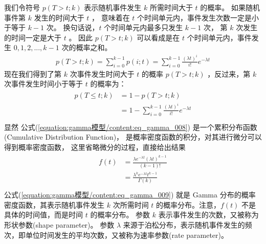 \documentclass[letterpaper,10pt,english]{sphinxmanual}
\begin{document}
我们令符号 \(p(T>t;k)\) 表示随机事件发生 \(k\) 所需时间大于 \(t\) 的概率。
如果随机事件第 \(k\) 发生的时间大于 \(t\) ，
意味着在 \(t\) 个时间单元内，事件发生次数一定是小于等于 \(k-1\) 次。
换句话说，\(t\) 个时间单元内最多只发生 \(k-1\) 次，
第 \(k\) 次发生的时间一定是大于 \(t\) 。
因此 \(p(T>t;k)\) 可以看成是在 \(t\) 个时间单元内，事件发生 \(0,1,2,...,k-1\) 次的概率之和。
\begin{equation}\label{equation:gamma模型/content:gamma模型/content:3}
\begin{split}p(T>t;k) = \sum_{i=0}^{k-1} p(i;t)
= \sum_{i=0}^{k-1} \frac{(\lambda t)^{i}}{i!}  e^{-\lambda t}\end{split}
\end{equation}
现在我们得到了第 \(k\) 次事件发生时间大于 \(t\) 的概率 \(p(T>t;k)\)
，反过来，第 \(k\) 次事件发生时间小于等于 \(t\) 的概率为：
\begin{align}\label{equation:gamma模型/content:eq_gamma_008}\!\begin{aligned}
p(T\le t;k) &= 1-p(T>t;k)\\
&= 1- \sum_{i=0}^{k-1} \frac{(\lambda t)^{i}}{i!}  e^{-\lambda t}\\
\end{aligned}\end{align}
显然 公式(\ref{equation:gamma模型/content:eq_gamma_008}) 是一个累积分布函数(Cumulative Distribution Function)，
是概率密度函数的积分，对其进行微分可以得到概率密度函数，
这里省略微分的过程，直接给出结果
\begin{align}\label{equation:gamma模型/content:eq_gamma_009}\!\begin{aligned}
f(t)
&= \frac{\lambda e^{-\lambda t}(\lambda t)^{k-1}}{(k-1)!}\\
&= \frac{\lambda^k e^{-\lambda t}t^{k-1}}{\Gamma(k)}\\
\end{aligned}\end{align}
公式(\ref{equation:gamma模型/content:eq_gamma_009}) 就是 Gamma 分布的概率密度函数，其表示随机事件发生 \(k\) 次所需时间 \(t\)
的概率分布。注意，\(f(t)\) 不是具体的时间值，而是时间 \(t\) 的概率分布。
参数 \(k\) 表示事件发生的次数，又被称为形状参数(shape parameter)。
参数 \(\lambda\) 来源于泊松分布，表示随机事件发生的频次，即单位时间发生的平均次数，又被称为速率参数(rate parameter)。
\end{document}
